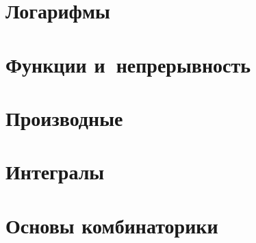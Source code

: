 \documentclass[]{scrartcl}
\begin{document}
\section{Логарифмы}
\section{Функции и~непрерывность}
\section{Производные}
\section{Интегралы}
\section{Основы комбинаторики}



\nocite{CSC:intro-in-matan}

\printbibliography[title=Источники информации]
\end{document}
